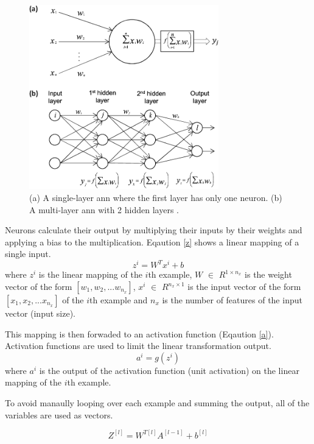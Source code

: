 \documentclass[runningheads]{llncs}
\begin{document}
\begin{figure}[H]
    \label{nn}
    \centering
    \includegraphics[height=8cm]{nn}
    \caption{(a) A single-layer \gls{ann} where the first layer has only one neuron. 
    (b) A multi-layer \gls{ann} with 2 hidden layers \cite{nnimage}. }
\end{figure}

Neurons calculate their output by multiplying their inputs by their weights and applying a bias to the multiplication. Eqaution \ref{z}
shows a linear mapping of a single input.
\begin{equation}
\label{z}
    z^i = W^Tx^i + b
\end{equation}
where $z^i$ is the linear mapping of the $i$th example,  $W$ $\in$ $ R^{1 \times n_{x}} $ is the weight vector of the form $[w_1, w_2, ... w_{n_{x}}]$, 
$x^i$ $\in$ $ R^{n_{x}\times1} $ is the input vector of the form $[x_1, x_2, ... x_{n_{x}}]$ of the $i$th example and $n_{x}$ is the number
of features of the input vector (input size).

This mapping is then forwaded to an activation function (Eqaution \ref{a}).
Activation functions are used to limit the linear transformation output.
\begin{equation}
    \label{a}
        a^i = g(z^i)
\end{equation}
where $a^i$ is the output of the activation function (unit activation) on the linear mapping of the $i$th example.

To avoid manaully looping over each example and summing the output, all of the variables are used
as vectors.

\begin{equation}
    \label{zeq1}
        Z^{[l]} = W^{T[l]}A^{[l-1]} + b^{[l]}
\end{equation}
\end{document}

